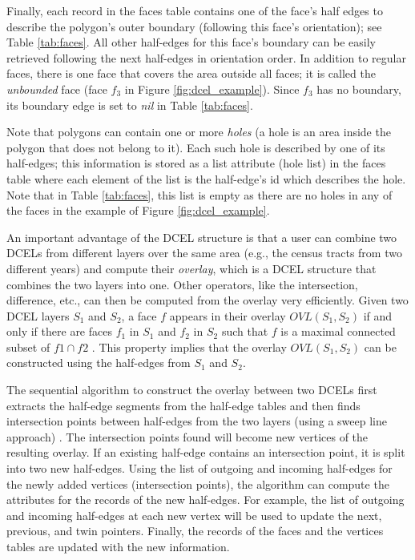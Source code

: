 Finally, each record in the faces table contains one of the face's half edges to describe the polygon's outer boundary (following this face's orientation); see Table \ref{tab:faces}. All other half-edges for this face's boundary can be easily retrieved following the next half-edges in orientation order. In addition to regular faces, there is one face that covers the area outside all faces; it is called the  \textit{unbounded} face (face $f_3$ in Figure \ref{fig:dcel_example}). Since $f_3$ has no boundary, its boundary edge is set to \textit{nil} in Table \ref{tab:faces}.

Note that polygons can contain one or more \textit{holes} (a hole is an area inside the polygon that does not belong to it). Each such hole is described by one of its half-edges; this information is stored as a list attribute (hole list) in the faces table where each element of the list is the half-edge's id which describes the hole. Note that in Table \ref{tab:faces}, this list is empty as there are no holes in any of the faces in the example of Figure \ref{fig:dcel_example}. 

An important advantage of the DCEL structure is that a user can combine two DCELs from different layers over the same area (e.g., the census tracts from two different years) and compute their \textit{overlay}, which is a DCEL structure that combines the two layers into one. Other operators, like the intersection, difference, etc., can then be computed from the overlay very efficiently. Given two DCEL layers $S_1$ and $S_2$, a face $f$ appears in their overlay  $OVL(S_1, S_2)$ if and only if there are faces $f_1$ in $S_1$ and $f_2$ in $S_2$ such that $f$ is a maximal connected subset of $f1 \cap f2$ \cite{berg_computational_2008}. This property implies that the overlay $OVL(S_1, S_2)$ can be constructed using the half-edges from $S_1$ and $S_2$. 

The sequential algorithm \cite{fogel_cgal_2012} to construct the overlay between two DCELs first extracts the half-edge segments from the half-edge tables and then finds intersection points between half-edges from the two layers (using a sweep line approach) \cite{berg_computational_2008}. The intersection points found will become new vertices of the resulting overlay. If an existing half-edge contains an intersection point, it is split into two new half-edges. Using the list of outgoing and incoming half-edges for the newly added vertices (intersection points), the algorithm can compute the attributes for the records of the new half-edges. For example, the list of outgoing and incoming half-edges at each new vertex will be used to update the next, previous, and twin pointers. Finally, the records of the faces and the vertices tables are updated with the new information. 

